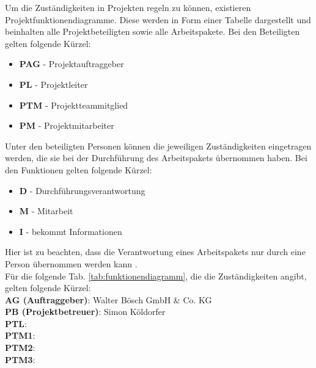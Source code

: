 Um die Zuständigkeiten in Projekten regeln zu können, existieren Projektfunktionendiagramme. Diese werden in Form einer Tabelle dargestellt und beinhalten alle Projektbeteiligten sowie alle Arbeitspakete. Bei den Beteiligten gelten folgende Kürzel:
\begin{itemize}
	\item \textbf{PAG} - Projektauftraggeber
	\item \textbf{PL} - Projektleiter
	\item \textbf{PTM} - Projektteammitglied
	\item \textbf{PM} - Projektmitarbeiter
\end{itemize}
Unter den beteiligten Personen können die jeweiligen Zuständigkeiten eingetragen werden, die sie bei der Durchführung des Arbeitspakets übernommen haben.
Bei den Funktionen gelten folgende Kürzel:
\begin{itemize}
	\item \textbf{D} - Durchführungsverantwortung
	\item \textbf{M} - Mitarbeit
	\item \textbf{I} - bekommt Informationen
\end{itemize}
Hier ist zu beachten, dass die Verantwortung eines Arbeitspakets nur durch eine Person übernommen werden kann \cite[vgl.][]{prezi:o.J.}. \\
Für die folgende Tab. \ref{tab:funktionendiagramm}, die die Zuständigkeiten angibt, gelten folgende Kürzel: \\ 
\textbf{AG (Auftraggeber)}: Walter Bösch GmbH \& Co. KG \\\textbf{PB (Projektbetreuer)}: Simon Köldorfer \\\textbf{PTL}: \mangeng \\\textbf{PTM1}: \pezze \\\textbf{PTM2}: \fenkart \\\textbf{PTM3}: \schneider

